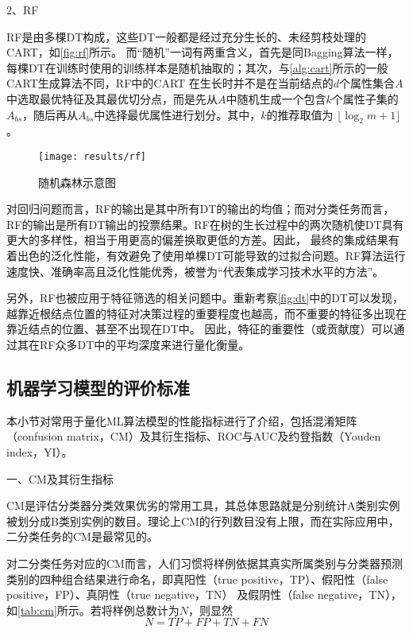 2、RF

RF是由多棵DT构成，这些DT一般都是经过充分生长的、未经剪枝处理的CART，如\autoref{fig:rf}所示。
而“随机”一词有两重含义，首先是同Bagging算法一样，每棵DT在训练时使用的训练样本是随机抽取的；其次，与\autoref{alg:cart}所示的一般CART生成算法不同，RF中的CART
在生长时并不是在当前结点的$d$个属性集合$A$中选取最优特征及其最优切分点，而是先从$A$中随机生成一个包含$k$个属性子集的$A_{bs}$，随后再从$A_{bs}$中选择最优属性进行划分\cite{Zhou2016,Liu2018,breiman2001}。其中，$k$的推荐取值为
$\lfloor \log_2m + 1 \rfloor$\cite{breiman2001}。

\begin{figure}[htbp]
    \centering
    \texttt{[image: results/rf]}
    \caption{\label{fig:rf}随机森林示意图}
\end{figure}

对回归问题而言，RF的输出是其中所有DT的输出的均值；而对分类任务而言，RF的输出是所有DT输出的投票结果。RF在树的生长过程中的两次随机使DT具有更大的多样性，相当于用更高的偏差换取更低的方差。因此，
最终的集成结果有着出色的泛化性能，有效避免了使用单棵DT可能导致的过拟合问题。RF算法运行速度快、准确率高且泛化性能优秀，被誉为“代表集成学习技术水平的方法”\cite{Zhou2016,Liu2018}。

另外，RF也被应用于特征筛选的相关问题中\cite{Aurélien2018}。重新考察\autoref{fig:dt}中的DT可以发现，越靠近根结点位置的特征对决策过程的重要程度也越高，而不重要的特征多出现在靠近结点的位置、甚至不出现在DT中。
因此，特征的重要性（或贡献度）可以通过其在RF众多DT中的平均深度来进行量化衡量。

\subsection{机器学习模型的评价标准}
本小节对常用于量化ML算法模型的性能指标进行了介绍，包括混淆矩阵（confusion matrix，CM）及其衍生指标、ROC与AUC及约登指数（Youden index，YI）。

一、CM及其衍生指标

CM是评估分类器分类效果优劣的常用工具\cite{Zhou2016,Aurélien2018}，其总体思路就是分别统计A类别实例被划分成B类别实例的数目。理论上CM的行列数目没有上限，而在实际应用中，
二分类任务的CM是最常见的。

对二分类任务对应的CM而言，人们习惯将样例依据其真实所属类别与分类器预测类别的四种组合结果进行命名，即真阳性（true positive，TP）、假阳性（false positive，FP）、真阴性（true negative，TN）
及假阴性（false negative，TN），如\autoref{tab:cm}所示。若将样例总数计为$N$，则显然
\begin{equation}
    \label{equ:cm}
    N=TP+FP+TN+FN
\end{equation}

